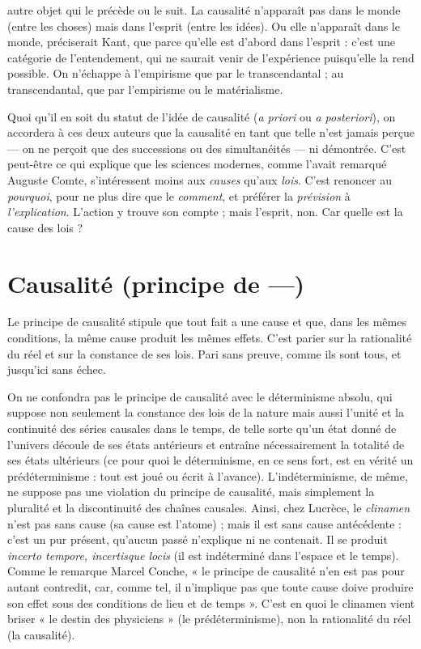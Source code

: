 autre objet qui le précède ou le suit. La causalité n’apparaît pas dans le monde
(entre les choses) mais dans l'esprit (entre les idées). Ou elle n’apparaît dans le
monde, préciserait Kant, que parce qu’elle est d’abord dans l'esprit : c’est une
catégorie de l’entendement, qui ne saurait venir de l'expérience puisqu'elle la
rend possible. On n’échappe à l’empirisme que par le transcendantal ; au transcendantal,
que par l’empirisme ou le matérialisme.

Quoi qu'il en soit du statut de l’idée de causalité ({\it a priori} ou {\it a posteriori}),
on accordera à ces deux auteurs que la causalité en tant que telle n’est jamais
perçue — on ne perçoit que des successions ou des simultanéités — ni démontrée.
C’est peut-être ce qui explique que les sciences modernes, comme l'avait
remarqué Auguste Comte, s'intéressent moins aux {\it causes} qu'aux {\it lois}. C’est
renoncer au {\it pourquoi}, pour ne plus dire que le {\it comment}, et préférer la {\it prévision}
à {\it l'explication}. L'action y trouve son compte ; mais l'esprit, non. Car quelle est
la cause des lois ?

\section{Causalité (principe de —)}
Le principe de causalité stipule que tout
fait a une cause et que, dans les mêmes
conditions, la même cause produit les mêmes effets. C’est parier sur la rationalité
du réel et sur la constance de ses lois. Pari sans preuve, comme ils sont tous,
et jusqu'ici sans échec.

On ne confondra pas le principe de causalité avec le déterminisme absolu,
qui suppose non seulement la constance des lois de la nature mais aussi l’unité
et la continuité des séries causales dans le temps, de telle sorte qu’un état donné
de l'univers découle de ses états antérieurs et entraîne nécessairement la totalité
de ses états ultérieurs (ce pour quoi le déterminisme, en ce sens fort, est en
vérité un prédéterminisme : tout est joué ou écrit à l'avance). L’indéterminisme,
de même, ne suppose pas une violation du principe de causalité, mais
simplement la pluralité et la discontinuité des chaînes causales. Ainsi, chez
Lucrèce, le {\it clinamen} n’est pas sans cause (sa cause est l’atome) ; mais il est sans
cause antécédente : c’est un pur présent, qu'aucun passé n’explique ni ne contenait.
Il se produit {\it incerto tempore, incertisque locis} (il est indéterminé dans
l’espace et le temps). Comme le remarque Marcel Conche, « le principe de causalité
n’en est pas pour autant contredit, car, comme tel, il n’implique pas que
toute cause doive produire son effet sous des conditions de lieu et de temps ».
C’est en quoi le clinamen vient briser « le destin des physiciens » (le prédéterminisme),
non la rationalité du réel (la causalité).

